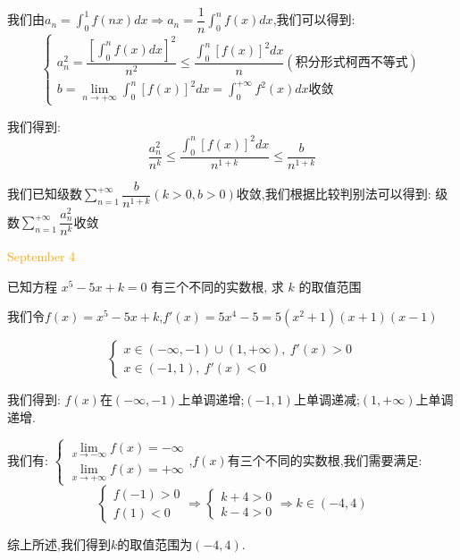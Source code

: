 \begin{solution}

	我们由$a_{n}=\int_{0}^{1}f(nx)dx\Rightarrow a_{n}=\dfrac{1}{n}\int_{0}^{n}f(x)dx$,我们可以得到:  
	$$\left\lbrace
	\begin{array}{l}
		a_{n}^2=\dfrac{[\int_{0}^{n}f(x)dx]^2}{n^2}\leq \dfrac{\int_{0}^{n}[f(x)]^2dx}{n}(\text{积分形式柯西不等式})\\
		b=\lim\limits_{n\to+\infty}\int_{0}^{n}[f(x)]^2dx=\int_{0}^{+\infty}f^{2}(x)dx\text{收敛}
	\end{array}
	\right. $$
	
	我们得到:  $$\dfrac{a_{n}^2}{n^{k}}\leq \dfrac{\int_{0}^{n}[f(x)]^2dx}{n^{1+k}}\leq \dfrac{b}{n^{1+k}}$$
	
	我们已知级数$\sum\limits_{n=1}^{+\infty}\dfrac{b}{n^{1+k}}(k>0,b>0)$收敛,我们根据比较判别法可以得到:  级数$\sum\limits_{n=1}^{+\infty}\dfrac{a_{n}^2}{n^k}$收敛
\end{solution}


\textcolor{orange}{September 4}

\begin{example}[][Exam: 35.1.7]
	已知方程 $x^5-5x+k=0$ 有三个不同的实数根, 求 $k$ 的取值范围
\end{example}

\begin{solution}

	我们令$f(x)=x^5-5x+k$,$f'(x)=5x^4-5=5(x^2+1)(x+1)(x-1)$
	
	$$\left\lbrace
	\begin{array}{l}
		x\in(-\infty,-1)\cup(1,+\infty),\ f'(x)>0\\
		x\in(-1,1),\ f'(x)<0
	\end{array}
	\right. $$
	
	我们得到:  $f(x)$在$(-\infty,-1)$上单调递增;$(-1,1)$上单调递减;$(1,+\infty)$上单调递增.
	
	我们有:  $\left\lbrace
	\begin{array}{l}
		\lim\limits_{x\to -\infty}f(x)=-\infty\\
		\lim\limits_{x\to +\infty}f(x)=+\infty
	\end{array}
	\right. $,$f(x)$有三个不同的实数根,我们需要满足:  
	$$\left\lbrace
	\begin{array}{l}
		f(-1)>0\\
		f(1)<0
	\end{array}
	\right. \Rightarrow \left\lbrace
	\begin{array}{l}
		k+4>0\\
		k-4>0
	\end{array}
	\right. \Rightarrow k\in(-4,4)$$
	
	综上所述,我们得到$k$的取值范围为$(-4,4)$.
\end{solution}

